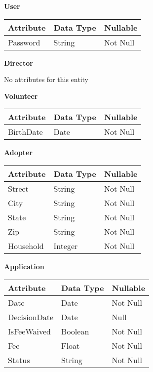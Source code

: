 \documentclass{article}
\begin{document}
\noindent\textbf{User}
\begin{table}[H]
    \begin{tabular}{|l|l|l|}
    \hline
    \textbf{Attribute} & \textbf{Data Type} & \textbf{Nullable} \\ \hline
    Password           & String             & Not Null          \\ \hline
    \end{tabular}
\end{table}

\noindent\textbf{Director}

No attributes for this entity
\begin{table}[H]
\end{table}

\noindent\textbf{Volunteer}
\begin{table}[H]
    \begin{tabular}{|l|l|l|}
    \hline
    \textbf{Attribute} & \textbf{Data Type} & \textbf{Nullable} \\ \hline
    BirthDate          & Date               & Not Null          \\ \hline 
    \end{tabular}
\end{table}

\noindent\textbf{Adopter}
\begin{table}[H]
    \begin{tabular}{|l|l|l|}
    \hline
    \textbf{Attribute} & \textbf{Data Type} & \textbf{Nullable} \\ \hline
    Street         & String             & Not Null          \\ \hline
    City           & String             & Not Null          \\ \hline
    State          & String             & Not Null          \\ \hline
    Zip            & String            & Not Null          \\ \hline
    Household      & Integer            & Not Null          \\ \hline
    \end{tabular}
\end{table}

\noindent \textbf{Application}
\begin{table}[H]
    \begin{tabular}{|l|l|l|}
    \hline
    \textbf{Attribute}       & \textbf{Data Type} & \textbf{Nullable} \\ \hline
    Date                     & Date               & Not Null          \\ \hline
    DecisionDate             & Date               & Null          \\ \hline
    IsFeeWaived              & Boolean            & Not Null          \\ \hline
    Fee                      & Float              & Not Null          \\ \hline
    Status                   & String             & Not Null          \\ \hline
    \end{tabular}
\end{table}
\end{document}
